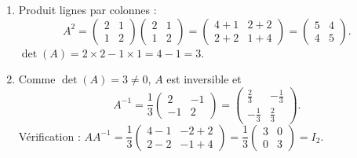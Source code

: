\documentclass[11pt]{article}
\begin{document}
\begin{corrige}
\begin{enumerate}
\item Produit lignes par colonnes :
\[ A^2=\begin{pmatrix} 2 & 1 \\ 1 & 2 \end{pmatrix}\begin{pmatrix} 2 & 1 \\ 1 & 2 \end{pmatrix}=\begin{pmatrix} 4+1 & 2+2 \\ 2+2 & 1+4 \end{pmatrix}=\begin{pmatrix} 5 & 4 \\ 4 & 5 \end{pmatrix}. \]
$\det(A)=2\times2-1\times1=4-1=3$.

\item Comme $\det(A)=3\neq0$, $A$ est inversible et
\[ A^{-1}=\frac{1}{3}\begin{pmatrix} 2 & -1 \\ -1 & 2 \end{pmatrix}=\begin{pmatrix} \tfrac{2}{3} & -\tfrac{1}{3} \\[2pt] -\tfrac{1}{3} & \tfrac{2}{3} \end{pmatrix}. \]
Vérification : $AA^{-1}=\dfrac{1}{3}\begin{pmatrix} 4-1 & -2+2 \\ 2-2 & -1+4 \end{pmatrix}=\dfrac{1}{3}\begin{pmatrix} 3 & 0 \\ 0 & 3 \end{pmatrix}=I_2$.


\end{enumerate}
\end{corrige}
\end{document}
